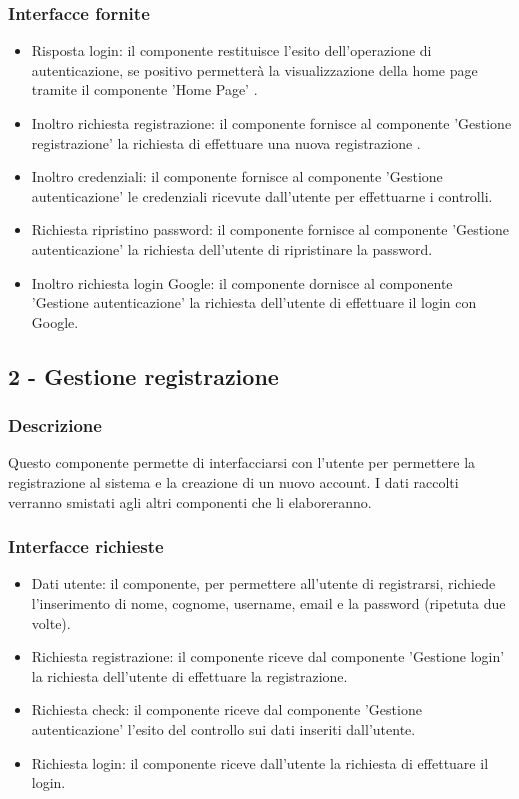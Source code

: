 \documentclass[a4paper,12pt]{article}
\begin{document}
\subsubsection*{Interfacce fornite}
\begin{itemize} \setlength\itemsep{0.01em}
\item {\sffamily Risposta login}: il componente restituisce l'esito dell'operazione di autenticazione, se positivo permetterà la visualizzazione della home page tramite il componente 'Home Page' .
\item {\sffamily Inoltro richiesta registrazione}: il componente fornisce al componente 'Gestione registrazione' la richiesta di effettuare una nuova registrazione .
\item {\sffamily Inoltro credenziali}: il componente fornisce al componente 'Gestione autenticazione' le credenziali ricevute dall'utente per effettuarne i controlli.
\item {\sffamily Richiesta ripristino password}: il componente fornisce al componente 'Gestione autenticazione' la richiesta dell'utente di ripristinare la password.
\item {\sffamily Inoltro richiesta login Google}: il componente dornisce al componente 'Gestione autenticazione' la richiesta dell'utente di effettuare il login con Google.
\end{itemize}





\subsection*{2 - Gestione registrazione}
\subsubsection*{Descrizione}
Questo componente permette di interfacciarsi con l’utente per permettere la registrazione al sistema e la creazione di un nuovo account. I dati raccolti verranno smistati agli altri componenti che li elaboreranno.

\subsubsection*{Interfacce richieste}
\begin{itemize} \setlength\itemsep{0.01em}
\item {\sffamily Dati utente}: il componente, per permettere all'utente di registrarsi, richiede l'inserimento di nome, cognome, username, email e la password (ripetuta due volte).
\item {\sffamily Richiesta registrazione}: il componente riceve dal componente 'Gestione login' la richiesta dell'utente di effettuare la registrazione.
\item {\sffamily Richiesta check}: il componente riceve dal componente 'Gestione autenticazione' l'esito del controllo sui dati inseriti dall'utente.
\item {\sffamily Richiesta login}: il componente riceve dall'utente la richiesta di effettuare il login.
\end{itemize}
\end{document}
